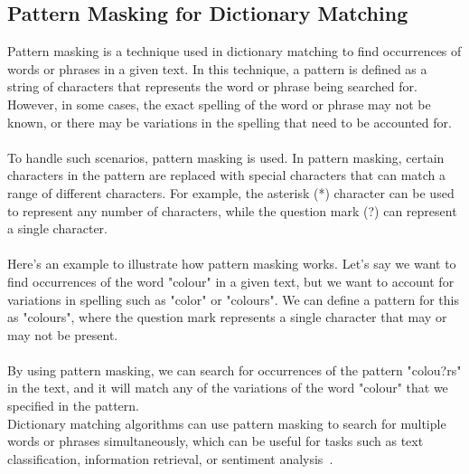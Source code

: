 \subsection{Pattern Masking for Dictionary Matching} \label{pmdm}
Pattern masking is a technique used in dictionary matching to find occurrences of words or phrases in a given text.
In this technique, a pattern  is defined as a string of characters that represents the word or phrase being searched for.
However, in some cases, the exact spelling of the word or phrase may not be known, or there may be variations in the
spelling that need to be accounted for.\\
\\
To handle such scenarios, pattern masking is used. In pattern masking, certain characters in the pattern are replaced
with special characters that can match a range of different characters. For example, the asterisk (*) character can be
used to represent any number of characters, while the question mark (?) can represent a single character.\\
\\
Here's an example to illustrate how pattern masking works. Let's say we want to find occurrences of the word
"colour" in a given text, but we want to account for variations in spelling such as "color" or "colours".
We can define a pattern for this as "colours", where the question mark represents a single character that
may or may not be present.\\
\\
By using pattern masking, we can search for occurrences of the pattern "colou?rs" in the text, and it will match
any of the variations of the word "colour" that we specified in the pattern.\\
Dictionary matching algorithms can use pattern masking to search for multiple words or phrases simultaneously,
which can be useful for tasks such as text classification, information retrieval, or sentiment analysis~\cite{pmdm}.


